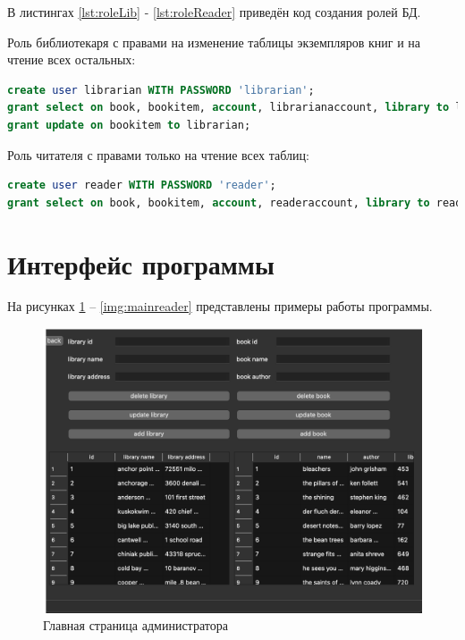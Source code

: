 В листингах \ref{lst:roleLib} - \ref{lst:roleReader} приведён код создания ролей БД. 

\noindent Роль библиотекаря с правами на изменение таблицы экземпляров книг и на чтение всех остальных:
\begin{lstlisting}[label=lst:roleLib, caption=Создание ролей, language=sql]
create user librarian WITH PASSWORD 'librarian';
grant select on book, bookitem, account, librarianaccount, library to librarian;
grant update on bookitem to librarian;
\end{lstlisting}

\noindent Роль читателя с правами только на чтение всех таблиц:
\begin{lstlisting}[label=lst:roleReader, caption=Создание ролей, language=sql]
create user reader WITH PASSWORD 'reader';
grant select on book, bookitem, account, readeraccount, library to reader;
\end{lstlisting}


\section{Интерфейс программы}

На рисунках \ref{img:mainadmin} -- \ref{img:mainreader} представлены примеры работы программы.

\begin{figure}[h!]
	\begin{center}
		\includegraphics[width = \linewidth]{img/main_admin.png}
	\end{center}
	\captionsetup{justification=centering}
	\caption{Главная страница администратора}
	\label{img:mainadmin}
\end{figure}

